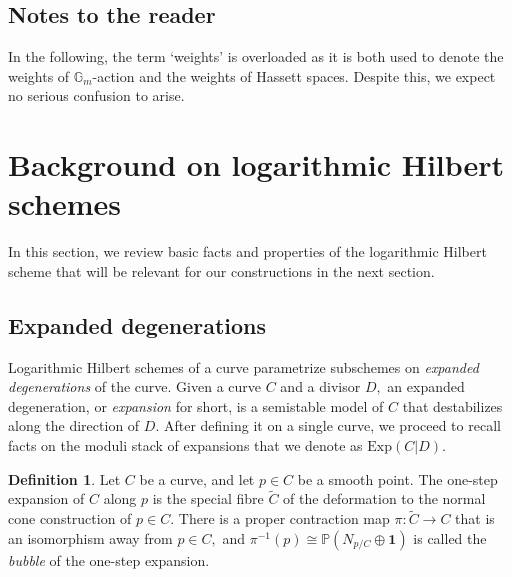 \documentclass[10.5pt]{amsart}
\theoremstyle{definition}
\theoremstyle{definition}
\theoremstyle{definition}
\theoremstyle{definition}
\newtheorem{definition}[theorem]{Definition}
\begin{document}
\subsection{Notes to the reader} In the following, the term `weights' is overloaded as it is both used to denote the weights of $\mathbb{G}_m$-action and the weights of Hassett spaces. Despite this, we expect no serious confusion to arise.


\section{Background on logarithmic Hilbert schemes}\label{sec:background}


In this section, we review basic facts and properties of the logarithmic Hilbert scheme that will be relevant for our constructions in the next section.

\subsection{Expanded degenerations}

Logarithmic Hilbert schemes of a curve parametrize subschemes on \emph{expanded degenerations} of the curve. Given a curve $C$ and a divisor $D,$ an expanded degeneration, or \emph{expansion} for short, is a semistable model of $C$ that destabilizes along the direction of $D.$ After defining it on a single curve, we proceed to recall facts on the moduli stack of expansions that we denote as $\mathrm{Exp}(C|D).$

\begin{definition}
    Let $C$ be a curve, and let $p\in C$ be a smooth point. The one-step expansion of $C$ along $p$ is the special fibre $\tilde{C}$ of the deformation to the normal cone construction of $p\in C.$ There is a proper contraction map $\pi: \tilde{C}\to C$ that is an isomorphism away from $p\in C,$ and $\pi^{-1}(p) \cong \mathbb{P}(N_{p/C}\oplus \mathbf{1})$ is called the \emph{bubble} of the one-step expansion.
\end{definition}
\end{document}
